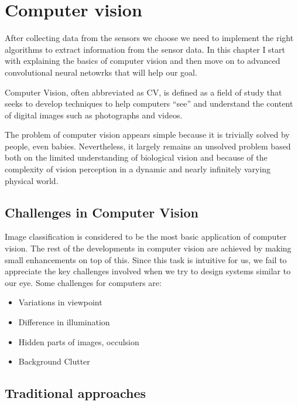 \chapter{Computer vision}
\label{chap:perceptions}

After collecting data from the sensors we choose we need to implement the right
algorithms to extract information from the sensor data. In this chapter I start
with explaining the basics of computer vision and then move on to advanced
convolutional neural netowrks that will help our goal.

Computer Vision, often abbreviated as CV, is defined as a field of study that
seeks to develop techniques to help computers “see” and understand the content
of digital images such as photographs and videos.

The problem of computer vision appears simple because it is trivially solved by
people, even babies. Nevertheless, it largely remains an unsolved
problem based both on the limited understanding of biological vision and because
of the complexity of vision perception in a dynamic and nearly infinitely
varying physical world.

\section{Challenges in Computer Vision}
Image classification is considered to be the most basic application of computer
vision. The rest of the developments in computer vision are achieved by making
small enhancements on top of this. Since this task is intuitive for us, we fail to
appreciate the key challenges involved when we try to design systems similar to
our eye. Some challenges for computers are:

\begin{itemize}
    \item Variations in viewpoint
    \item Difference in illumination
    \item Hidden parts of images, occulsion
    \item Background Clutter
\end{itemize}

\section{Traditional approaches}

